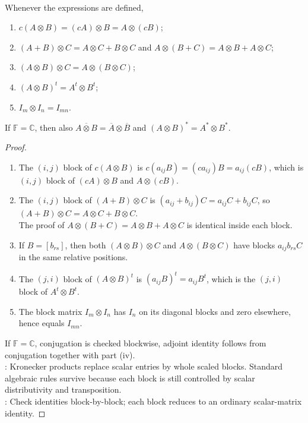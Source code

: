 \begin{proposition} \label{prop:basic-kronecker-identities} \\
Whenever the expressions are defined,
\begin{enumerate}[label=(\roman*)]
\setlength{\itemsep}{0pt}
\item $c(A\otimes B)=(cA)\otimes B=A\otimes(cB)$;
\item $(A+B)\otimes C=A\otimes C+B\otimes C$ and $A\otimes(B+C)=A\otimes B+A\otimes C$;
\item $(A\otimes B)\otimes C=A\otimes(B\otimes C)$;
\item $(A\otimes B)^t=A^t\otimes B^t$;
\item $I_m\otimes I_n=I_{mn}$.
\end{enumerate}
If $\mathbb{F}=\mathbb{C}$, then also $\overline{A\otimes B}=\overline{A}\otimes\overline{B}$ and $(A\otimes B)^*=A^*\otimes B^*$.
\begin{proof}
\begin{enumerate}[label=(\roman*)]
\setlength{\itemsep}{0pt}
\item The $(i,j)$ block of $c(A\otimes B)$ is $c(a_{ij}B)=(ca_{ij})B=a_{ij}(cB)$, which is $(i,j)$ block of $(cA)\otimes B$ and $A\otimes(cB)$.
\item The $(i,j)$ block of $(A+B)\otimes C$ is $(a_{ij}+b_{ij})C=a_{ij}C+b_{ij}C$, so $(A+B)\otimes C=A\otimes C+B\otimes C$.\\
The proof of $A\otimes(B+C)=A\otimes B+A\otimes C$ is identical inside each block.
\item If $B=[b_{rs}]$, then both $(A\otimes B)\otimes C$ and $A\otimes(B\otimes C)$ have blocks $a_{ij}b_{rs}C$ in the same relative positions.
\item The $(j,i)$ block of $(A\otimes B)^t$ is $(a_{ij}B)^t=a_{ij}B^t$, which is the $(j,i)$ block of $A^t\otimes B^t$.
\item The block matrix $I_m\otimes I_n$ has $I_n$ on its diagonal blocks and zero elsewhere, hence equals $I_{mn}$.
\end{enumerate}
If $\mathbb{F}=\mathbb{C}$, conjugation is checked blockwise, adjoint identity follows from conjugation together with part (iv).\\
: Kronecker products replace scalar entries by whole scaled blocks. Standard algebraic rules survive because each block is still controlled by scalar distributivity and transposition.\\
: Check identities block-by-block; each block reduces to an ordinary scalar-matrix identity.
\end{proof}
\end{proposition}

